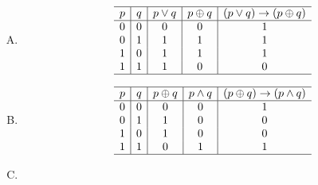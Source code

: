 {{        %
        \begin{practices}
            \begin{enumerate}[A.]
                \item
                {
                    \begin{table}[H]
                        \[
                            \begin{array}{c|c|c|c|c}
                                \hline
                                p & q & p \vee q & p \oplus q & (p \vee q) \rightarrow (p \oplus q) \\
                                \hline
                                0 & 0 & 0 & 0 & 1 \\
                                0 & 1 & 1 & 1 & 1 \\
                                1 & 0 & 1 & 1 & 1 \\
                                1 & 1 & 1 & 0 & 0 \\
                                \hline
                            \end{array}
                        \]
                    \end{table}
                }
                \item
                {
                    \begin{table}[H]
                        \[
                            \begin{array}{c|c|c|c|c}
                                \hline
                                p & q & p \oplus q & p \wedge q & (p \oplus q) \rightarrow (p \wedge q) \\
                                \hline
                                0 & 0 & 0 & 0 & 1 \\
                                0 & 1 & 1 & 0 & 0 \\
                                1 & 0 & 1 & 0 & 0 \\
                                1 & 1 & 0 & 1 & 1 \\
                                \hline
                            \end{array}
                        \]
                    \end{table}
                }
                \item
                {
                    \begin{table}[H]
                        \[
                            \begin{array}{c|c|c|c|c}

\end{array}\]
\end{table}}
\end{enumerate}
\end{practices}}}
